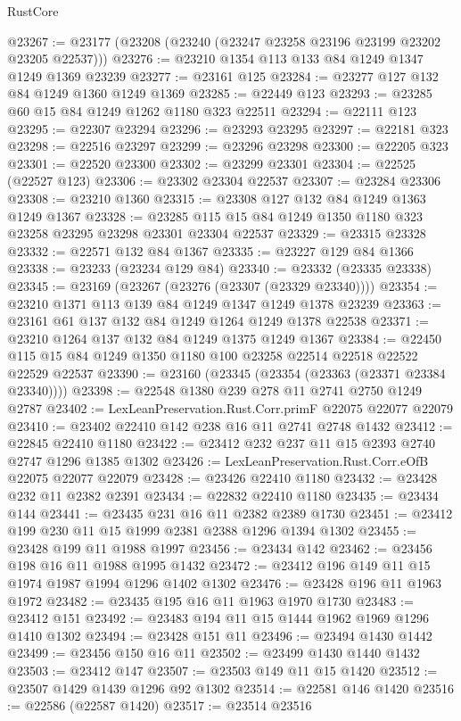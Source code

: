 \begin{lexlean}{RustCore}
\begin{coremodule}
@23267 := @23177 (@23208 (@23240 (@23247 @23258 @23196 @23199 @23202 @23205 @22537)))
@23276 := @23210 @1354 @113 @133 @84 @1249 @1347 @1249 @1369 @23239
@23277 := @23161 @125
@23284 := @23277 @127 @132 @84 @1249 @1360 @1249 @1369
@23285 := @22449 @123
@23293 := @23285 @60 @15 @84 @1249 @1262 @1180 @323 @22511
@23294 := @22111 @123
@23295 := @22307 @23294
@23296 := @23293 @23295
@23297 := @22181 @323
@23298 := @22516 @23297
@23299 := @23296 @23298
@23300 := @22205 @323
@23301 := @22520 @23300
@23302 := @23299 @23301
@23304 := @22525 (@22527 @123)
@23306 := @23302 @23304 @22537
@23307 := @23284 @23306
@23308 := @23210 @1360
@23315 := @23308 @127 @132 @84 @1249 @1363 @1249 @1367
@23328 := @23285 @115 @15 @84 @1249 @1350 @1180 @323 @23258 @23295 @23298 @23301 @23304 @22537
@23329 := @23315 @23328
@23332 := @22571 @132 @84 @1367
@23335 := @23227 @129 @84 @1366
@23338 := @23233 (@23234 @129 @84)
@23340 := @23332 (@23335 @23338)
@23345 := @23169 (@23267 (@23276 (@23307 (@23329 @23340))))
@23354 := @23210 @1371 @113 @139 @84 @1249 @1347 @1249 @1378 @23239
@23363 := @23161 @61 @137 @132 @84 @1249 @1264 @1249 @1378 @22538
@23371 := @23210 @1264 @137 @132 @84 @1249 @1375 @1249 @1367
@23384 := @22450 @115 @15 @84 @1249 @1350 @1180 @100 @23258 @22514 @22518 @22522 @22529 @22537
@23390 := @23160 (@23345 (@23354 (@23363 (@23371 @23384 @23340))))
@23398 := @22548 @1380 @239 @278 @11 @2741 @2750 @1249 @2787
@23402 := LexLeanPreservation.Rust.Corr.primF @22075 @22077 @22079
@23410 := @23402 @22410 @142 @238 @16 @11 @2741 @2748 @1432
@23412 := @22845 @22410 @1180
@23422 := @23412 @232 @237 @11 @15 @2393 @2740 @2747 @1296 @1385 @1302
@23426 := LexLeanPreservation.Rust.Corr.eOfB @22075 @22077 @22079
@23428 := @23426 @22410 @1180
@23432 := @23428 @232 @11 @2382 @2391
@23434 := @22832 @22410 @1180
@23435 := @23434 @144
@23441 := @23435 @231 @16 @11 @2382 @2389 @1730
@23451 := @23412 @199 @230 @11 @15 @1999 @2381 @2388 @1296 @1394 @1302
@23455 := @23428 @199 @11 @1988 @1997
@23456 := @23434 @142
@23462 := @23456 @198 @16 @11 @1988 @1995 @1432
@23472 := @23412 @196 @149 @11 @15 @1974 @1987 @1994 @1296 @1402 @1302
@23476 := @23428 @196 @11 @1963 @1972
@23482 := @23435 @195 @16 @11 @1963 @1970 @1730
@23483 := @23412 @151
@23492 := @23483 @194 @11 @15 @1444 @1962 @1969 @1296 @1410 @1302
@23494 := @23428 @151 @11
@23496 := @23494 @1430 @1442
@23499 := @23456 @150 @16 @11
@23502 := @23499 @1430 @1440 @1432
@23503 := @23412 @147
@23507 := @23503 @149 @11 @15 @1420
@23512 := @23507 @1429 @1439 @1296 @92 @1302
@23514 := @22581 @146 @1420
@23516 := @22586 (@22587 @1420)
@23517 := @23514 @23516

\end{coremodule}
\end{lexlean}
